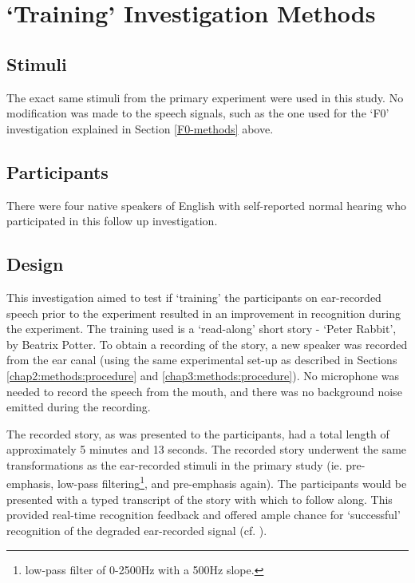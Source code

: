 \section{`Training' Investigation Methods}
\label{training-methods}

\subsection{Stimuli}

The exact same stimuli from the primary experiment were used in this study. No modification was made to the speech signals, such as the one used for the `F0' investigation explained in Section \ref{F0-methods} above.

\subsection{Participants}

There were four native speakers of English with self-reported normal hearing who participated in this follow up investigation.

\subsection{Design}

This investigation aimed to test if `training' the participants on ear-recorded speech prior to the experiment resulted in an improvement in recognition during the experiment.  The training used is a `read-along' short story - `Peter Rabbit', by Beatrix Potter.  To obtain a recording of the story, a new speaker was recorded from the ear canal (using the same experimental set-up as described in Sections \ref{chap2:methods:procedure} and \ref{chap3:methods:procedure}).  No microphone was needed to record the speech from the mouth, and there was no background noise emitted during the recording.  

The recorded story, as was presented to the participants, had a total length of approximately 5 minutes and 13 seconds.  The recorded story underwent the same transformations as the ear-recorded stimuli in the primary study (ie. pre-emphasis, low-pass filtering\footnote{low-pass filter of 0-2500Hz with a 500Hz slope.}, and pre-emphasis again).  The participants would be presented with a typed transcript of the story with which to follow along.  This provided real-time recognition feedback and offered ample chance for `successful' recognition of the degraded ear-recorded signal (cf. \cite{davis:05}).

